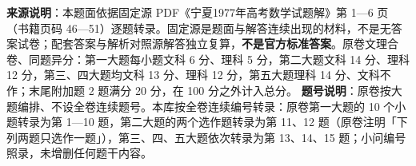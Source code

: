 


\begin{gktip}
\textbf{来源说明}：本题面依据固定源 PDF《宁夏1977年高考数学试题解》第 1—6 页（书籍页码 46—51）逐题转录。固定源是题面与解答连续出现的材料，不是无答案试卷；配套答案与解析对照源解答独立复算，\textbf{不是官方标准答案}。原卷文理合卷、同题异分：第一大题每小题文科 6 分、理科 5 分，第二大题文科 14 分、理科 12 分，第三、四大题均文科 13 分、理科 12 分，第五大题理科 14 分、文科不作；末尾附加题 2 题满分 20 分，在 100 分之外计入总分。
\textbf{题号说明}：原卷按大题编排、不设全卷连续题号。本库按全卷连续编号转录：原卷第一大题的 10 个小题转录为第 1—10 题，第二大题的两个选作题转录为第 11、12 题（原卷注明「下列两题只选作一题」），第三、四、五大题依次转录为第 13、14、15 题；小问编号照录，未增删任何题干内容。
\end{gktip}

\par\medskip


